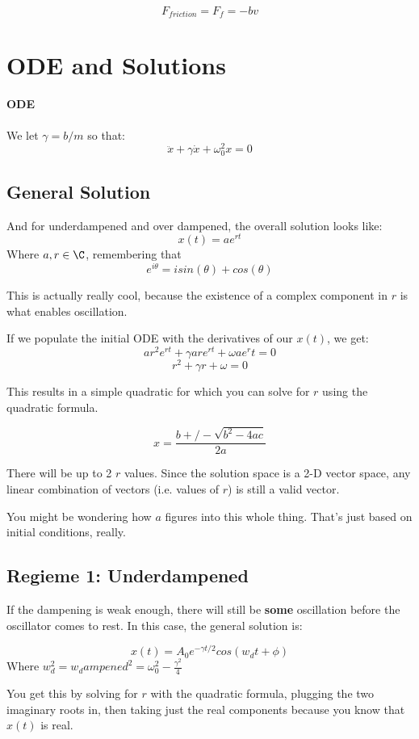 \documentclass[a4paper,12pt]{report}
\begin{document}
$$F_{friction} = F_f = -bv$$

\section{ODE and Solutions}
\paragraph{ODE}
We let $\gamma = b/m$ so that:
$$\ddot{x} + \gamma \dot{x} + \omega_0^2 x = 0$$

\subsection{General Solution}

And for underdampened and over dampened, the overall solution looks like:
$$x(t) = ae^{rt}$$
Where $a, r \in \C$, remembering that $$e^{i\theta} = i sin(\theta) + cos(\theta)$$

This is actually really cool, because the existence of a complex component in $r$ is what 
enables oscillation. 

If we populate the initial ODE with the derivatives of our $x(t)$, we get:
$$ar^2e^{rt} + \gamma are^{rt} + \omega ae^rt = 0$$
$$r^2 + \gamma r + \omega = 0$$

This results in a simple quadratic for which you can solve for $r$ using the quadratic formula.

$$x = \frac{b +/- \sqrt{b^2 - 4ac}}{2a}$$

There will be up to 2 $r$ values. Since the solution space is a 2-D vector space, any 
linear combination of vectors (i.e. values of $r$) is still a valid vector.

You might be wondering how $a$ figures into this whole thing. That's just based on initial
conditions, really. 

\subsection{Regieme 1: Underdampened}
If the dampening is weak enough, there will still be \textbf{some} oscillation before the 
oscillator comes to rest. In this case, the general solution is:

$$x(t) = A_0 e^{-\gamma t/2} cos(w_dt + \phi)$$
Where $w_d^2 = w_dampened^2 = \omega_0^2 - \frac{\gamma^2}{4}$

You get this by solving for $r$ with the quadratic formula, plugging the two imaginary 
roots in, then taking just the real components because you know that $x(t)$ is real.
\end{document}

